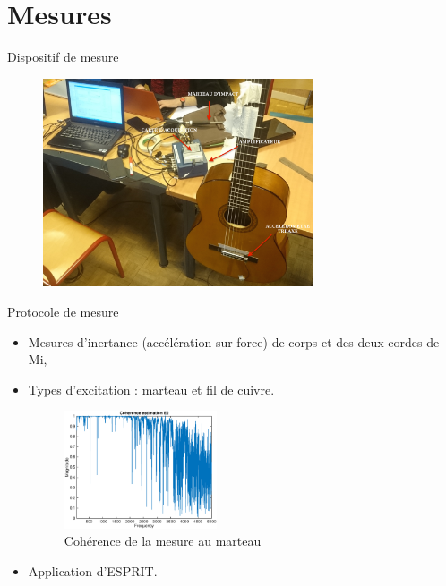 \section{Mesures}

\begin{frame}{Dispositif de mesure}
\begin{figure}
\centering
\includegraphics[width = 8cm]{figures/dispo.JPG}
\end{figure}
\end{frame}

 \begin{frame}{Protocole de mesure} 
  \begin{itemize}
  	\item Mesures d'inertance (accélération sur force) de corps et des deux cordes de Mi,
  	\item Types d'excitation : marteau et fil de cuivre.
    \begin{figure}
		\centering
		\includegraphics[width = 4.5cm]{figures/coherence_Z_1_E2.eps}
	\caption{Cohérence de la mesure au marteau}
	\end{figure}
  \item Application d'ESPRIT.
  \end{itemize} 
 \end{frame}
